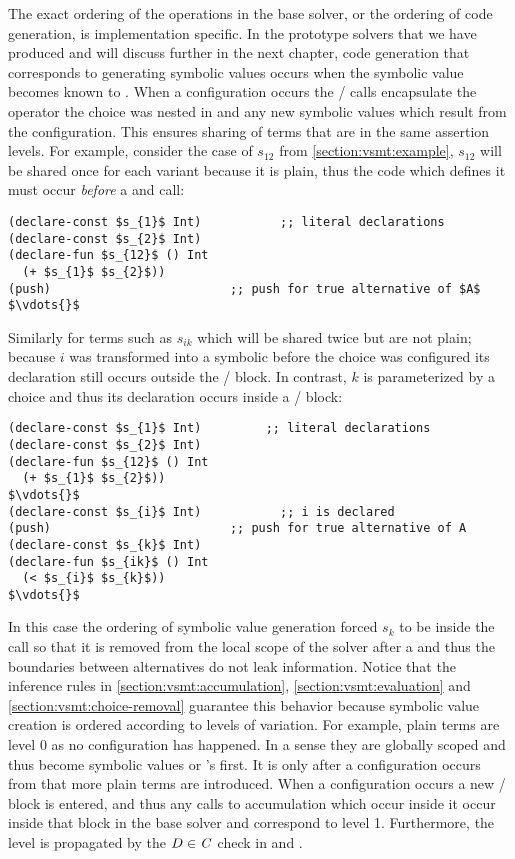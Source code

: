 The exact ordering of the operations in the base solver, or the ordering of code
generation, is implementation specific. In the prototype solvers that we have
produced and will discuss further in the next chapter, code generation that
corresponds to generating symbolic values occurs when the symbolic value becomes
known to \aStore. When a configuration occurs the / calls
encapsulate the operator the choice was nested in and any new symbolic values
which result from the configuration. This ensures sharing of terms that are in
the same assertion levels. For example, consider the case of $s_{12}$ from
\autoref{section:vsmt:example}, $s_{12}$ will be shared once for each variant
because it is plain, thus the code which defines it must occur \emph{before} a
 and  call:
%
\begin{lstlisting}[columns=flexible,keepspaces=true,language=SMTLIB]
(declare-const $s_{1}$ Int)           ;; literal declarations
(declare-const $s_{2}$ Int)
(declare-fun $s_{12}$ () Int
  (+ $s_{1}$ $s_{2}$))
(push)                         ;; push for true alternative of $A$
$\vdots{}$
\end{lstlisting}
%
Similarly for terms such as $s_{ik}$ which will be shared twice but are not
plain; because $i$ was transformed into a symbolic before the choice was
configured its declaration still occurs outside the / block. In
contrast, $k$ is parameterized by a choice and thus its declaration occurs
inside a / block:
%
\begin{lstlisting}[columns=flexible,keepspaces=true,language=SMTLIB,breaklines=true]
(declare-const $s_{1}$ Int)         ;; literal declarations
(declare-const $s_{2}$ Int)
(declare-fun $s_{12}$ () Int
  (+ $s_{1}$ $s_{2}$))
$\vdots{}$
(declare-const $s_{i}$ Int)           ;; i is declared
(push)                         ;; push for true alternative of A
(declare-const $s_{k}$ Int)
(declare-fun $s_{ik}$ () Int
  (< $s_{i}$ $s_{k}$))
$\vdots{}$
\end{lstlisting}
%
In this case the ordering of symbolic value generation forced $s_{k}$ to be
inside the  call so that it is removed from the local scope of the
solver after a  and thus the boundaries between alternatives do not leak
information. Notice that the inference rules in
\autoref{section:vsmt:accumulation}, \autoref{section:vsmt:evaluation} and
\autoref{section:vsmt:choice-removal} guarantee this behavior because symbolic
value creation is ordered according to levels of variation. For example, plain
terms are level 0 as no configuration has happened. In a sense they are globally
scoped and thus become symbolic values or \unit{}'s first. It is only after a
configuration occurs from \crChc{} that more plain terms are introduced. When a
configuration occurs a new / block is entered, and thus any
calls to accumulation which occur inside it occur inside that block in the base
solver and correspond to level 1. Furthermore, the level is propagated by the $D
\in \mathit{C}$ check in \crChcT{} and \crChcF{}.

